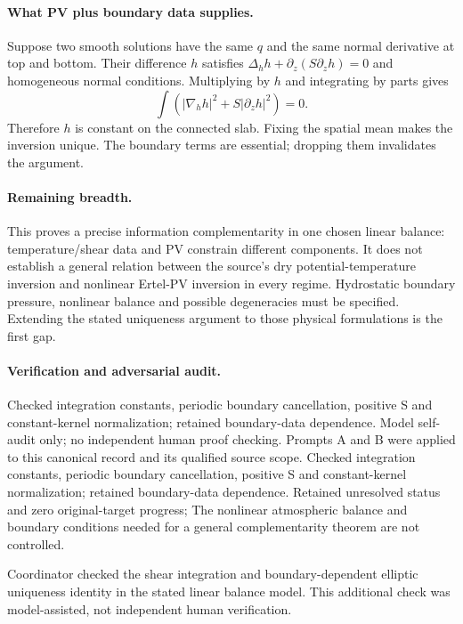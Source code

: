\documentclass[11pt]{article}
\begin{document}
\paragraph{What PV plus boundary data supplies.} Suppose two smooth solutions have the same $q$ and the same normal derivative at top and bottom. Their difference $h$ satisfies $\Delta_hh+\partial_z(S\partial_zh)=0$ and homogeneous normal conditions. Multiplying by $h$ and integrating by parts gives
\[
 \int(|\nabla_hh|^2+S|\partial_zh|^2)=0.
\]
Therefore $h$ is constant on the connected slab. Fixing the spatial mean makes the inversion unique. The boundary terms are essential; dropping them invalidates the argument.

\paragraph{Remaining breadth.} This proves a precise information complementarity in one chosen linear balance: temperature/shear data and PV constrain different components. It does not establish a general relation between the source's dry potential-temperature inversion and nonlinear Ertel-PV inversion in every regime. Hydrostatic boundary pressure, nonlinear balance and possible degeneracies must be specified. Extending the stated uniqueness argument to those physical formulations is the first gap.

\paragraph{Verification and adversarial audit.}
Checked integration constants, periodic boundary cancellation, positive S and constant-kernel normalization; retained boundary-data dependence. Model self-audit only; no independent human proof checking. Prompts A and B were applied to this canonical record and its qualified source scope. Checked integration constants, periodic boundary cancellation, positive S and constant-kernel normalization; retained boundary-data dependence. Retained unresolved status and zero original-target progress; The nonlinear atmospheric balance and boundary conditions needed for a general complementarity theorem are not controlled.

Coordinator checked the shear integration and boundary-dependent elliptic uniqueness identity in the stated linear balance model. This additional check was model-assisted, not independent human verification.
\end{document}
